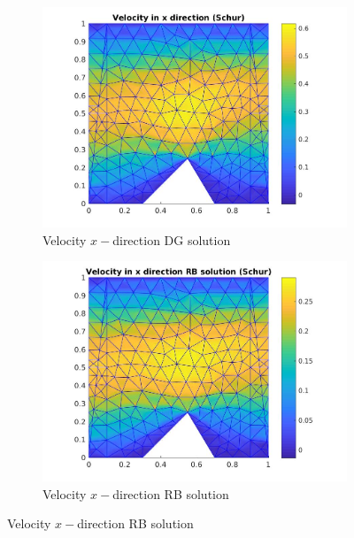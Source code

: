 \documentclass[a4paper,oneside,openright,spanish,english]{book}
\begin{document}
\begin{figure}[t!] %
\begin{subfigure}{0.48\textwidth}
\includegraphics[width=\linewidth]{offline_velocity_1_at_55_25.jpg}
\caption{Velocity $x-$direction DG solution} \label{vel_x_dg}
\end{subfigure}\hspace*{\fill}
\begin{subfigure}{0.48\textwidth}
\includegraphics[width=\linewidth]{online_velocity_1_at_55_25.jpg}
\caption{Velocity $x-$direction RB solution} \label{vel_x_rb}
\end{subfigure}


\end{figure}
\end{document}
